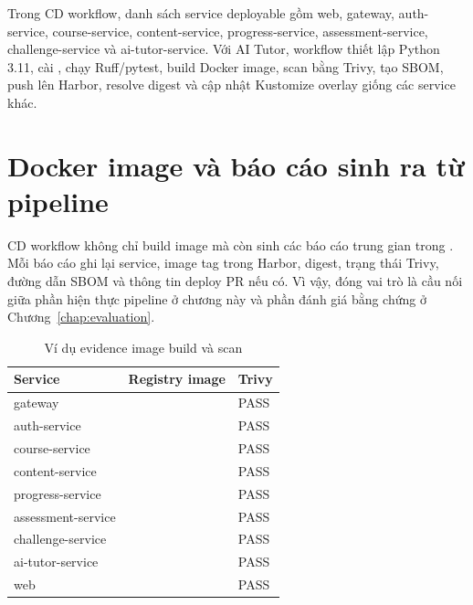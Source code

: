 Trong CD workflow, danh sách service deployable gồm web, gateway, auth-service, course-service, content-service, progress-service, assessment-service, challenge-service và ai-tutor-service. Với AI Tutor, workflow thiết lập Python 3.11, cài , chạy Ruff/pytest, build Docker image, scan bằng Trivy, tạo SBOM, push lên Harbor, resolve digest và cập nhật Kustomize overlay giống các service khác.

\section{Docker image và báo cáo sinh ra từ pipeline}

CD workflow không chỉ build image mà còn sinh các báo cáo trung gian trong . Mỗi báo cáo ghi lại service, image tag trong Harbor, digest, trạng thái Trivy, đường dẫn SBOM và thông tin deploy PR nếu có. Vì vậy,  đóng vai trò là cầu nối giữa phần hiện thực pipeline ở chương này và phần đánh giá bằng chứng ở Chương~\ref{chap:evaluation}.

\begin{table}[H]
\centering
\caption{Ví dụ evidence image build và scan}
\label{tab:image-evidence}
\begin{tabularx}{\textwidth}{|p{}|Y|p{0.16\textwidth}|}
\hline
\textbf{Service} & \textbf{Registry image} & \textbf{Trivy} \\
\hline
gateway &  & PASS \\
auth-service &  & PASS \\
course-service &  & PASS \\
content-service &  & PASS \\
progress-service &  & PASS \\
assessment-service &  & PASS \\
challenge-service &  & PASS \\
ai-tutor-service &  & PASS \\
web &  & PASS \\
\hline
\end{tabularx}
\end{table}

